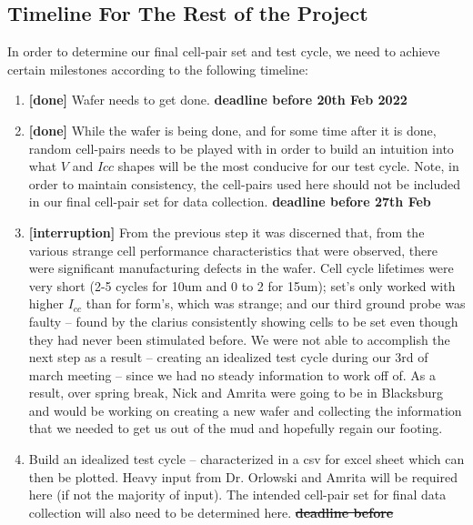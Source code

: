 \documentclass{article}
\begin{document}
      \subsection{Timeline For The Rest of the Project}

        In order to determine our final cell-pair set and test cycle, we need to achieve certain milestones according to
        the following timeline:
        
        \begin{enumerate}
          \item \textbf{[done]} Wafer needs to get done. \textbf{deadline before 20th Feb 2022}
          \item \textbf{[done]} While the wafer is being done, and for some time after it is done, random cell-pairs
            needs to be played with in order to build an intuition into what $V$ and $Icc$ shapes will be the most
            conducive for our test cycle. Note, in order to maintain consistency, the cell-pairs used here should not be
            included in our final cell-pair set for data collection. \textbf{deadline before 27th Feb}
          \item \textbf{[interruption]} From the previous step it was discerned that, from the various strange cell
            performance characteristics that were observed, there were significant manufacturing defects in the wafer.
            Cell cycle lifetimes were very short (2-5 cycles for 10um and 0 to 2 for 15um); set's only worked with
            higher $I_{cc}$ than for form's, which was strange; and our third ground probe was faulty -- found by the
            clarius consistently showing cells to be set even though they had never been stimulated before. We were not
            able to accomplish the next step as a result -- creating an idealized test cycle during our 3rd of march
            meeting -- since we had no steady information to work off of. As a result, over spring break, Nick and
            Amrita were going to be in Blacksburg and would be working on creating a new wafer and collecting the
            information that we needed to get us out of the mud and hopefully regain our footing.
          \item Build an idealized test cycle -- characterized in a csv for excel sheet which can then be plotted. Heavy
            input from Dr. Orlowski and Amrita will be required here (if not the majority of input). The intended
            cell-pair set for final data collection will also need to be determined here. \textbf{\sout{deadline before
}}
\end{enumerate}
\end{document}
